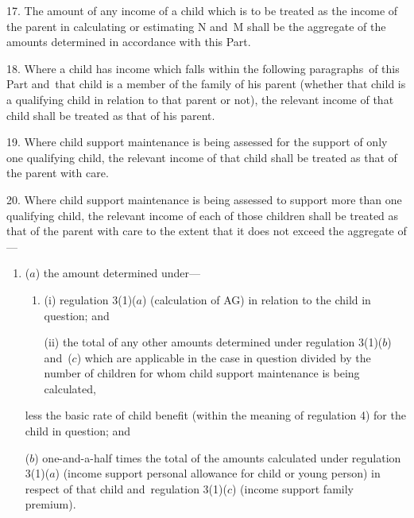 \documentclass[12pt,a4paper]{article}
\begin{document}
\renewcommand\parthead{--- Schedule 1 Part IV}

17.  The amount of any income of a child which is to be treated as the income of the parent in calculating or estimating N and~M shall be the aggregate of the amounts determined in accordance with this Part.

\medskip

18.  Where a child has income which falls within the following paragraphs~of this Part and~that child is a member of the family of his parent (whether that child is a qualifying child in relation to that parent or not), the relevant income of that child shall be treated as that of his parent.

\medskip

19.  Where child support maintenance is being assessed for the support of only one qualifying child, the relevant income of that child shall be treated as that of the parent with care.

\medskip

20.  Where child support maintenance is being assessed to support more than one qualifying child, the relevant income of each of those children shall be treated as that of the parent with care to the extent that it does not exceed the aggregate of—
\begin{enumerate}\item[]
($a$) the amount determined under—
\begin{enumerate}\item[]
(i) regulation 3(1)($a$) (calculation of AG) in relation to the child in question; and

(ii) the total of any other amounts determined under regulation 3(1)($b$) 
and~($c$)  %
which are applicable in the case in question divided by the number of children for whom child support maintenance is being calculated,
\end{enumerate}
less the basic rate of child benefit (within the meaning of regulation 4) for the child in question; and

($b$) 
one-and-a-half times  %
the total of the amounts calculated under regulation 3(1)($a$) (income support personal allowance for child or young person) in respect of that child and~regulation 
3(1)($c$)  %
(income support family premium).
\end{enumerate}
\end{document}
